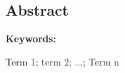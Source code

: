 \begin{otherlanguage}{english}

\chapter*{Abstract}

\lipsum[1-2]

\vspace{1cm}

\textbf{Keywords:}

Term 1; term 2; ...; Term n
	 
\vfill


\end{otherlanguage}